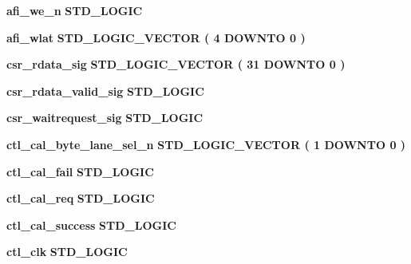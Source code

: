 \begin{DoxyCompactItemize}
\item 
{\bf afi\+\_\+we\+\_\+n} {\bfseries \textcolor{comment}{S\+T\+D\+\_\+\+L\+O\+G\+IC}\textcolor{vhdlchar}{ }} 
\item 
{\bf afi\+\_\+wlat} {\bfseries \textcolor{comment}{S\+T\+D\+\_\+\+L\+O\+G\+I\+C\+\_\+\+V\+E\+C\+T\+OR}\textcolor{vhdlchar}{ }\textcolor{vhdlchar}{(}\textcolor{vhdlchar}{ }\textcolor{vhdlchar}{ } \textcolor{vhdldigit}{4} \textcolor{vhdlchar}{ }\textcolor{keywordflow}{D\+O\+W\+N\+TO}\textcolor{vhdlchar}{ }\textcolor{vhdlchar}{ } \textcolor{vhdldigit}{0} \textcolor{vhdlchar}{ }\textcolor{vhdlchar}{)}\textcolor{vhdlchar}{ }} 
\item 
{\bf csr\+\_\+rdata\+\_\+sig} {\bfseries \textcolor{comment}{S\+T\+D\+\_\+\+L\+O\+G\+I\+C\+\_\+\+V\+E\+C\+T\+OR}\textcolor{vhdlchar}{ }\textcolor{vhdlchar}{(}\textcolor{vhdlchar}{ }\textcolor{vhdlchar}{ } \textcolor{vhdldigit}{31} \textcolor{vhdlchar}{ }\textcolor{keywordflow}{D\+O\+W\+N\+TO}\textcolor{vhdlchar}{ }\textcolor{vhdlchar}{ } \textcolor{vhdldigit}{0} \textcolor{vhdlchar}{ }\textcolor{vhdlchar}{)}\textcolor{vhdlchar}{ }} 
\item 
{\bf csr\+\_\+rdata\+\_\+valid\+\_\+sig} {\bfseries \textcolor{comment}{S\+T\+D\+\_\+\+L\+O\+G\+IC}\textcolor{vhdlchar}{ }} 
\item 
{\bf csr\+\_\+waitrequest\+\_\+sig} {\bfseries \textcolor{comment}{S\+T\+D\+\_\+\+L\+O\+G\+IC}\textcolor{vhdlchar}{ }} 
\item 
{\bf ctl\+\_\+cal\+\_\+byte\+\_\+lane\+\_\+sel\+\_\+n} {\bfseries \textcolor{comment}{S\+T\+D\+\_\+\+L\+O\+G\+I\+C\+\_\+\+V\+E\+C\+T\+OR}\textcolor{vhdlchar}{ }\textcolor{vhdlchar}{(}\textcolor{vhdlchar}{ }\textcolor{vhdlchar}{ } \textcolor{vhdldigit}{1} \textcolor{vhdlchar}{ }\textcolor{keywordflow}{D\+O\+W\+N\+TO}\textcolor{vhdlchar}{ }\textcolor{vhdlchar}{ } \textcolor{vhdldigit}{0} \textcolor{vhdlchar}{ }\textcolor{vhdlchar}{)}\textcolor{vhdlchar}{ }} 
\item 
{\bf ctl\+\_\+cal\+\_\+fail} {\bfseries \textcolor{comment}{S\+T\+D\+\_\+\+L\+O\+G\+IC}\textcolor{vhdlchar}{ }} 
\item 
{\bf ctl\+\_\+cal\+\_\+req} {\bfseries \textcolor{comment}{S\+T\+D\+\_\+\+L\+O\+G\+IC}\textcolor{vhdlchar}{ }} 
\item 
{\bf ctl\+\_\+cal\+\_\+success} {\bfseries \textcolor{comment}{S\+T\+D\+\_\+\+L\+O\+G\+IC}\textcolor{vhdlchar}{ }} 
\item 
{\bf ctl\+\_\+clk} {\bfseries \textcolor{comment}{S\+T\+D\+\_\+\+L\+O\+G\+IC}\textcolor{vhdlchar}{ }} 
\item 

\end{DoxyCompactItemize}
